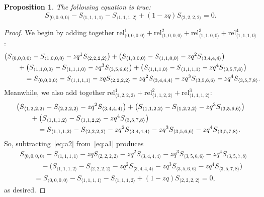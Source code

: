 \documentclass[10pt,a4paper]{amsart}
\numberwithin{equation}{section}
\newtheorem{Proposition}[Theorem]{Proposition}
\theoremstyle{definition}
\newcommand{\rel}{\text{rel}}
\begin{document}
\begin{Proposition} The following equation is true:
\begin{equation*}S_{\langle 0,0,0,0\rangle} - S_{\langle 1,1,1,1\rangle} -
S_{\langle 1,1,1,2\rangle} + (1-zq) S_{\langle 2,2,2,2\rangle}=0.
\end{equation*}
\end{Proposition}
\begin{proof}
We begin by adding together $\rel^1_{\langle 0,0,0,0\rangle}+\rel^2_{\langle 1,0,0,0\rangle}+\rel^3_{\langle 1,1,0,0\rangle}+\rel^4_{\langle 1,1,1,0\rangle}$:
\begin{align}
&\bigl(S_{\langle 0,0,0,0\rangle} - S_{\langle 1,0,0,0\rangle} - zq^{1} S_{\langle 2,2,2,2\rangle}\bigr)
 +\bigl(S_{\langle 1,0,0,0\rangle} - S_{\langle 1,1,0,0\rangle} - zq^{2} S_{\langle 3,4,4,4\rangle}\bigr) \notag\\
& \qquad {}+\bigl(S_{\langle 1,1,0,0\rangle} - S_{\langle 1,1,1,0\rangle} - zq^{3} S_{\langle 3,5,6,6\rangle}\bigr) +\bigl(S_{\langle 1,1,1,0\rangle} - S_{\langle 1,1,1,1\rangle} - zq^{4} S_{\langle 3,5,7,8\rangle} \bigr) \notag\\
& \quad\qquad {}=S_{\langle 0,0,0,0\rangle} - S_{\langle 1,1,1,1\rangle} - zq S_{\langle 2,2,2,2\rangle} - zq^{2} S_{\langle 3,4,4,4\rangle} - zq^{3} S_{\langle 3,5,6,6\rangle}
- zq^{4} S_{\langle 3,5,7,8\rangle}.\!\!\! \label{eq:a1}
\end{align}
Meanwhile, we also add together $\rel^1_{\langle 1,2,2,2\rangle}+\rel^2_{\langle 1,1,2,2\rangle}+\rel^3_{\langle 1,1,1,2\rangle}$:
\begin{align}
&\bigl(S_{\langle 1,2,2,2\rangle} - S_{\langle 2,2,2,2\rangle} - zq^{2} S_{\langle 3,4,4,4\rangle}\bigr) +\bigl(S_{\langle 1,1,2,2\rangle} - S_{\langle 1,2,2,2\rangle} - zq^{3} S_{\langle 3,5,6,6\rangle}\bigr) \notag\\
& \qquad {}+\bigl(S_{\langle 1,1,1,2\rangle} - S_{\langle 1,1,2,2\rangle} - zq^{4} S_{\langle 3,5,7,8\rangle}\bigr) \notag\\
& \qquad\quad{} = S_{\langle 1,1,1,2\rangle}- S_{\langle 2,2,2,2\rangle} - zq^{2} S_{\langle 3,4,4,4\rangle}
- zq^{3} S_{\langle 3,5,6,6\rangle} - zq^{4} S_{\langle 3,5,7,8\rangle}. \label{eq:a2}
\end{align}
So, subtracting~\eqref{eq:a2} from~\eqref{eq:a1} produces
\begin{align*}
&S_{\langle 0,0,0,0\rangle} - S_{\langle 1,1,1,1\rangle} - zq S_{\langle 2,2,2,2\rangle} - zq^{2} S_{\langle 3,4,4,4\rangle} - zq^{3} S_{\langle 3,5,6,6\rangle}
- zq^{4} S_{\langle 3,5,7,8\rangle} \\
& \qquad\quad{} -\bigl(S_{\langle 1,1,1,2\rangle}- S_{\langle 2,2,2,2\rangle} - zq^{2} S_{\langle 3,4,4,4\rangle}
- zq^{3} S_{\langle 3,5,6,6\rangle} - zq^{4} S_{\langle 3,5,7,8\rangle}\bigr) \\
& \qquad =S_{\langle 0,0,0,0\rangle} - S_{\langle 1,1,1,1\rangle} - S_{\langle 1,1,1,2\rangle}+(1-zq)S_{\langle 2,2,2,2\rangle} =0,
\end{align*}
as desired.
\end{proof}
\end{document}
